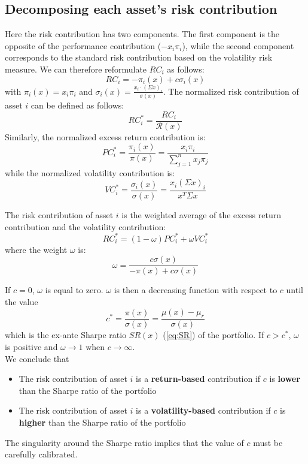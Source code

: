 \subsection{Decomposing each asset's risk contribution}
Here the risk contribution has two components. The first component is the opposite of the performance contribution ($-x_i\pi_i$), while the second component corresponds to the standard risk contribution based on the volatility risk measure. We can therefore reformulate $RC_i$ as follows:
\begin{equation}
RC_i = -\pi_i(x) + c \sigma_i(x)
\end{equation}
with $\pi_i(x) = x_i\pi_i$ and $\sigma_i(x) = \frac{x_i \cdot (\Sigma x)_i}{\sigma(x)}$. The normalized risk contribution of asset $i$ can be defined as follows:
\begin{equation}
RC^*_i = \frac{RC_i}{\mathcal{R}(x)}
\end{equation}
Similarly, the normalized excess return contribution is:
\begin{equation}
PC^*_i = \frac{\pi_i(x)}{\pi(x)} = \frac{x_i \pi_i}{\sum_{j=1}^n x_j \pi_j}
\end{equation}
while the normalized volatility contribution is:
\begin{equation}
VC^*_i = \frac{\sigma_i(x)}{\sigma(x)} = \frac{x_i(\Sigma x)_i}{x^T \Sigma x}
\end{equation}

\begin{theorem}
The risk contribution of asset $i$ is the weighted average of the excess return contribution and the volatility contribution:
\begin{equation}
RC^*_i = (1-\omega)PC^*_i + \omega VC^*_i
\end{equation}
where the weight $\omega$ is:
\begin{equation}
\omega = \frac{c \sigma(x)}{- \pi(x) + c\sigma(x)}
\end{equation}
\end{theorem}
If $c=0$, $\omega$ is equal to zero. $\omega$ is then a decreasing function with respect to $c$ until the value
\begin{equation}
c^* = \frac{\pi(x)}{\sigma (x)} = \frac{\mu(x)-\mu_r}{\sigma(x)}
\end{equation}
which is the ex-ante Sharpe ratio $SR(x)$ (\ref{eq:SR}) of the portfolio. If $c > c^*$, $\omega$ is positive and $\omega \rightarrow 1$ when $c \rightarrow \infty$.\\
We conclude that
\begin{itemize}
\item The risk contribution of asset $i$ is a \textbf{return-based} contribution if $c$ is \textbf{lower} than the Sharpe ratio of the portfolio
\item The risk contribution of asset $i$ is a \textbf{volatility-based} contribution if $c$ is \textbf{higher} than the Sharpe ratio of the portfolio
\end{itemize}
The singularity around the Sharpe ratio implies that the value of $c$ must be carefully calibrated.

